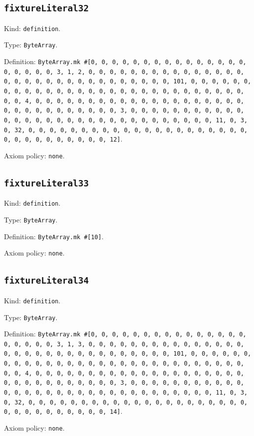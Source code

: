 \documentclass[11pt]{article}
\begin{document}
\subsection*{\texttt{fixtureLiteral32}}
\noindent Kind: \texttt{definition}.\par
\noindent Type: \texttt{ByteArray}.\par
\noindent Definition: \texttt{ByteArray.mk \#[0, 0, 0, 0, 0, 0, 0, 0, 0, 0, 0, 0, 0, 0, 0, 0, 0, 0, 0, 0, 3, 1, 2, 0, 0, 0, 0, 0, 0, 0, 0, 0, 0, 0, 0, 0, 0, 0, 0, 0, 0, 0, 0, 0, 0, 0, 0, 0, 0, 0, 0, 0, 0, 0, 101, 0, 0, 0, 0, 0, 0, 0, 0, 0, 0, 0, 0, 0, 0, 0, 0, 0, 0, 0, 0, 0, 0, 0, 0, 0, 0, 0, 0, 0, 0, 0, 4, 0, 0, 0, 0, 0, 0, 0, 0, 0, 0, 0, 0, 0, 0, 0, 0, 0, 0, 0, 0, 0, 0, 0, 0, 0, 0, 0, 0, 0, 0, 0, 3, 0, 0, 0, 0, 0, 0, 0, 0, 0, 0, 0, 0, 0, 0, 0, 0, 0, 0, 0, 0, 0, 0, 0, 0, 0, 0, 0, 0, 0, 0, 0, 11, 0, 3, 0, 32, 0, 0, 0, 0, 0, 0, 0, 0, 0, 0, 0, 0, 0, 0, 0, 0, 0, 0, 0, 0, 0, 0, 0, 0, 0, 0, 0, 0, 0, 0, 0, 12]}.\par
\noindent Axiom policy: \texttt{none}.\par
\subsection*{\texttt{fixtureLiteral33}}
\noindent Kind: \texttt{definition}.\par
\noindent Type: \texttt{ByteArray}.\par
\noindent Definition: \texttt{ByteArray.mk \#[10]}.\par
\noindent Axiom policy: \texttt{none}.\par
\subsection*{\texttt{fixtureLiteral34}}
\noindent Kind: \texttt{definition}.\par
\noindent Type: \texttt{ByteArray}.\par
\noindent Definition: \texttt{ByteArray.mk \#[0, 0, 0, 0, 0, 0, 0, 0, 0, 0, 0, 0, 0, 0, 0, 0, 0, 0, 0, 0, 3, 1, 3, 0, 0, 0, 0, 0, 0, 0, 0, 0, 0, 0, 0, 0, 0, 0, 0, 0, 0, 0, 0, 0, 0, 0, 0, 0, 0, 0, 0, 0, 0, 0, 101, 0, 0, 0, 0, 0, 0, 0, 0, 0, 0, 0, 0, 0, 0, 0, 0, 0, 0, 0, 0, 0, 0, 0, 0, 0, 0, 0, 0, 0, 0, 0, 4, 0, 0, 0, 0, 0, 0, 0, 0, 0, 0, 0, 0, 0, 0, 0, 0, 0, 0, 0, 0, 0, 0, 0, 0, 0, 0, 0, 0, 0, 0, 0, 3, 0, 0, 0, 0, 0, 0, 0, 0, 0, 0, 0, 0, 0, 0, 0, 0, 0, 0, 0, 0, 0, 0, 0, 0, 0, 0, 0, 0, 0, 0, 0, 11, 0, 3, 0, 32, 0, 0, 0, 0, 0, 0, 0, 0, 0, 0, 0, 0, 0, 0, 0, 0, 0, 0, 0, 0, 0, 0, 0, 0, 0, 0, 0, 0, 0, 0, 0, 14]}.\par
\noindent Axiom policy: \texttt{none}.\par
\end{document}

